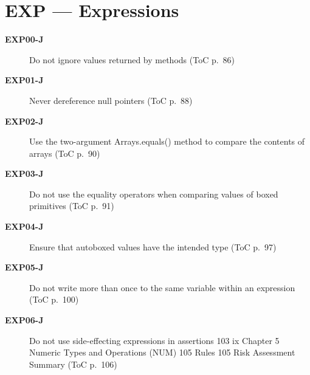\documentclass[11pt]{report}
\begin{document}
\chapter{EXP — Expressions}
\begin{description}
\item[\textbf{EXP00-J}] Do not ignore values returned by methods (ToC p.~86)
\item[\textbf{EXP01-J}] Never dereference null pointers (ToC p.~88)
\item[\textbf{EXP02-J}] Use the two-argument Arrays.equals() method to compare the contents of arrays (ToC p.~90)
\item[\textbf{EXP03-J}] Do not use the equality operators when comparing values of boxed primitives (ToC p.~91)
\item[\textbf{EXP04-J}] Ensure that autoboxed values have the intended type (ToC p.~97)
\item[\textbf{EXP05-J}] Do not write more than once to the same variable within an expression (ToC p.~100)
\item[\textbf{EXP06-J}] Do not use side-effecting expressions in assertions 103 ix Chapter 5 Numeric Types and Operations (NUM) 105 Rules 105 Risk Assessment Summary (ToC p.~106)
\end{description}
\clearpage
\end{document}
